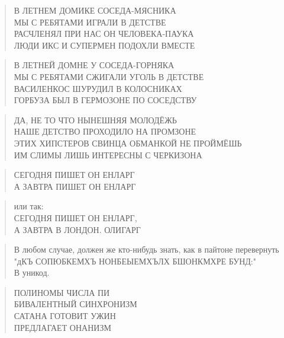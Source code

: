 \poemtitle{***}
\begin{verse}
В ЛЕТНЕМ ДОМИКЕ СОСЕДА-МЯСНИКА\\
МЫ С РЕБЯТАМИ ИГРАЛИ В ДЕТСТВЕ\\
РАСЧЛЕНЯЛ ПРИ НАС ОН ЧЕЛОВЕКА-ПАУКА\\
ЛЮДИ ИКС И СУПЕРМЕН ПОДОХЛИ ВМЕСТЕ
\end{verse}

\poemtitle{***}
\begin{verse}
В ЛЕТНЕЙ ДОМНЕ У СОСЕДА-ГОРНЯКА\\
МЫ С РЕБЯТАМИ СЖИГАЛИ УГОЛЬ В ДЕТСТВЕ\\
ВАСИЛЕНКОС ШУРУДИЛ В КОЛОСНИКАХ\\
ГОРБУЗА БЫЛ В ГЕРМОЗОНЕ ПО СОСЕДСТВУ
\end{verse}

\poemtitle{***}
\begin{verse}
ДА, НЕ ТО ЧТО НЫНЕШНЯЯ МОЛОДЁЖЬ\\
НАШЕ ДЕТСТВО ПРОХОДИЛО НА ПРОМЗОНЕ\\
ЭТИХ ХИПСТЕРОВ СВИНЦА ОБМАНКОЙ НЕ ПРОЙМЁШЬ\\
ИМ СЛИМЫ ЛИШЬ ИНТЕРЕСНЫ С ЧЕРКИЗОНА
\end{verse}

\poemtitle{***}
\begin{verse}
СЕГОДНЯ ПИШЕТ ОН ЕНЛАРГ\\
А ЗАВТРА ПИШЕТ ОН ЕНЛАРГ
\end{verse}

\poemtitle{***}
\begin{verse}
или так:\\
СЕГОДНЯ ПИШЕТ ОН ЕНЛАРГ,\\
А ЗАВТРА В ЛОНДОН. ОЛИГАРГ
\end{verse}

\poemtitle{***}
\begin{verse}
В любом случае, должен же кто-нибудь знать, как в пайтоне перевернуть\\
"дКЪ СОПЮБКЕМХЪ НОНБЕЫЕМХЪЛХ БШОНКМХРЕ БУНД:"\\
В уникод.
\end{verse}

\poemtitle{***}
\begin{verse}
ПОЛИНОМЫ ЧИСЛА ПИ\\
БИВАЛЕНТНЫЙ СИНХРОНИЗМ\\
САТАНА ГОТОВИТ УЖИН\\
ПРЕДЛАГАЕТ ОНАНИЗМ
\end{verse}

